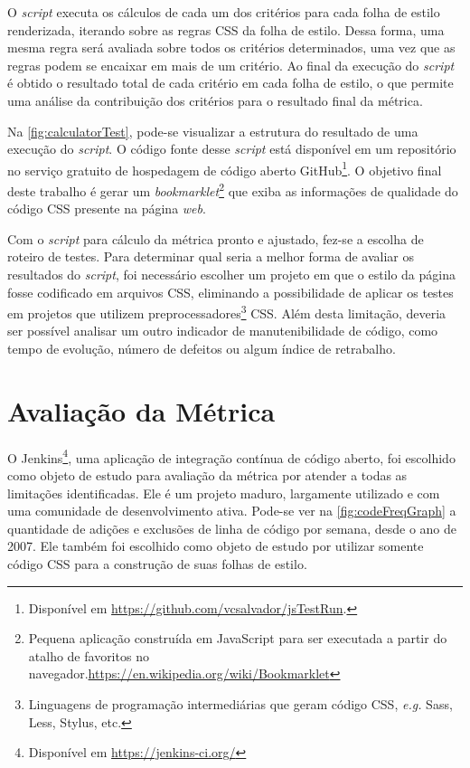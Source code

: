 O \textit{script} executa os cálculos de cada um dos critérios para cada folha de estilo renderizada, iterando sobre as regras CSS da folha de estilo. Dessa forma, uma mesma regra será avaliada sobre todos os critérios determinados, uma vez que as regras podem se encaixar em mais de um critério. Ao final da execução do \textit{script} é obtido o resultado total de cada critério em cada folha de estilo, o que permite uma análise da contribuição dos critérios para o resultado final da métrica.

Na \autoref{fig:calculatorTest}, pode-se visualizar a estrutura do resultado de uma execução do \textit{script}. O código fonte desse \textit{script} está disponível em um repositório no serviço gratuito de hospedagem de código aberto GitHub\footnote{Disponível em \url{https://github.com/vcsalvador/jsTestRun}.}. O objetivo final deste trabalho é gerar um \textit{bookmarklet}\footnote{Pequena aplicação construída em JavaScript para ser executada a partir do atalho de favoritos no navegador.\url{https://en.wikipedia.org/wiki/Bookmarklet}} que exiba as informações de qualidade do código CSS presente na página \textit{web}.

Com o \textit{script} para cálculo da métrica pronto e ajustado, fez-se a escolha de roteiro de testes. Para determinar qual seria a melhor forma de avaliar os resultados do \textit{script}, foi necessário escolher um projeto em que o estilo da página fosse codificado em arquivos CSS, eliminando a possibilidade de aplicar os testes em projetos que utilizem preprocessadores\footnote{Linguagens de programação intermediárias que geram código CSS, \textit{e.g.} Sass, Less, Stylus, etc.} CSS. Além desta limitação, deveria ser possível analisar um outro indicador de manutenibilidade de código, como tempo de evolução, número de defeitos ou algum índice de retrabalho.

\chapter{Avaliação da Métrica}

O Jenkins\footnote{Disponível em \url{https://jenkins-ci.org/}}, uma aplicação de integração contínua de código aberto, foi escolhido como objeto de estudo para avaliação da métrica por atender a todas as limitações identificadas. Ele é um projeto maduro, largamente utilizado e com uma comunidade de desenvolvimento ativa. Pode-se ver na \autoref{fig:codeFreqGraph} a quantidade de adições e exclusões de linha de código por semana, desde o ano de 2007. Ele também foi escolhido como objeto de estudo por utilizar somente código CSS para a construção de suas folhas de estilo.

